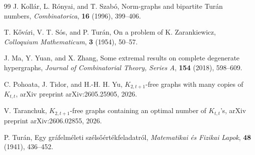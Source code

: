 \documentclass[11pt,a4paper]{article}
\theoremstyle{definition}
\theoremstyle{remark}
\begin{document}
\begin{thebibliography}{99}
 J. Koll\'ar, L. R\'onyai, and T. Szab\'o, Norm-graphs and bipartite Tur\'an numbers, \textit{Combinatorica}, {\bf16} (1996), 399--406.

 T. K\H{o}v\'{a}ri, V. T. S\'{o}s, and P. Tur\'{a}n, On a problem of K. Zarankiewicz, \textit{Colloquium Mathematicum}, {\bf3} (1954), 50--57.

 J. Ma, Y. Yuan, and X. Zhang, Some extremal results on complete degenerate hypergraphs, \textit{Journal of Combinatorial Theory, Series A}, {\bf154} (2018), 598--609.

 C. Pohoata, J. Tidor, and H.-H. H. Yu, $K_{2,t+1}$-free graphs with many copies of $K_{t,t}$, arXiv preprint arXiv:2605.25905, 2026.

 V. Taranchuk, $K_{2,t+1}$-free graphs containing an optimal number of $K_{t,t}$'s, arXiv preprint arXiv:2606.02855, 2026.

 P. Tur\'{a}n, Egy gr\'{a}felm\'{e}leti sz\'{e}ls\H{o}\'{e}rt\'{e}kfeladatr\'{o}l, \textit{Matematikai és Fizikai Lapok}, {\bf48} (1941), 436--452.

\end{thebibliography}
\end{document}
